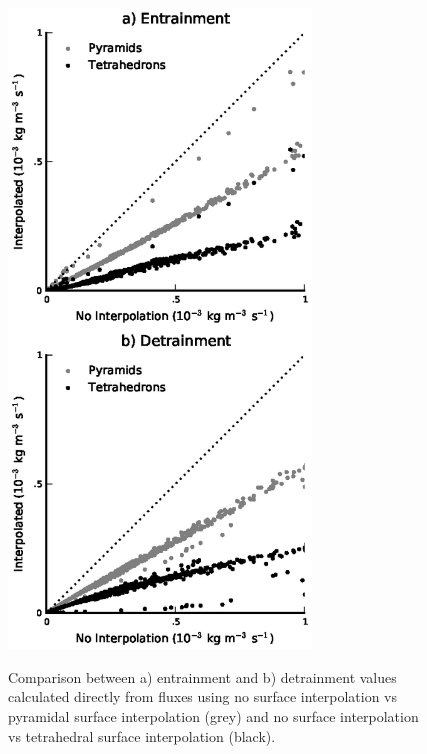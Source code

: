 \documentclass[12pt]{article}
\begin{document}
\begin{figure}[t]
  \noindent\includegraphics[width=19pc,angle=0]{./figures/effect_of_interpolation}\\
  \caption{Comparison between a) entrainment and b) detrainment values 
calculated directly from fluxes using no surface interpolation vs pyramidal 
surface interpolation (grey) and no surface interpolation vs tetrahedral 
surface interpolation (black).}\label{fig:effect_of_interpolation}
\end{figure}
\end{document}
